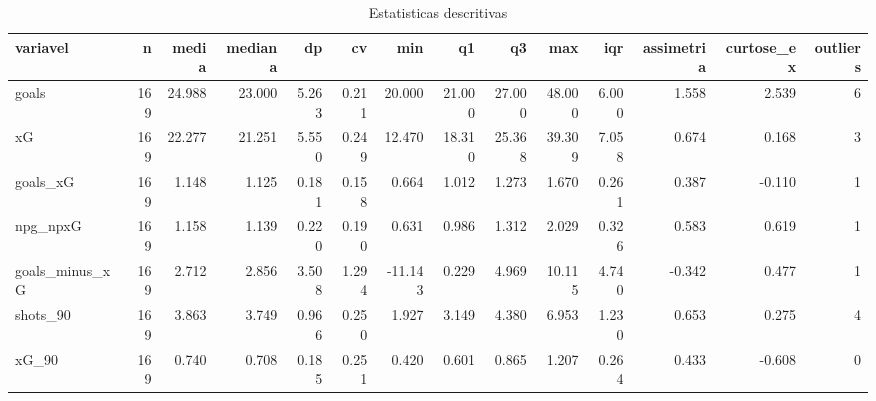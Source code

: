 \begin{table}

\caption{\label{tab:desc_g20}Estatisticas descritivas}
\centering
\begin{tabular}[t]{lrrrrrrrrrrrrr}
\toprule
variavel & n & media & mediana & dp & cv & min & q1 & q3 & max & iqr & assimetria & curtose\_ex & outliers\\
\midrule
goals & 169 & 24.988 & 23.000 & 5.263 & 0.211 & 20.000 & 21.000 & 27.000 & 48.000 & 6.000 & 1.558 & 2.539 & 6\\
xG & 169 & 22.277 & 21.251 & 5.550 & 0.249 & 12.470 & 18.310 & 25.368 & 39.309 & 7.058 & 0.674 & 0.168 & 3\\
goals\_xG & 169 & 1.148 & 1.125 & 0.181 & 0.158 & 0.664 & 1.012 & 1.273 & 1.670 & 0.261 & 0.387 & -0.110 & 1\\
npg\_npxG & 169 & 1.158 & 1.139 & 0.220 & 0.190 & 0.631 & 0.986 & 1.312 & 2.029 & 0.326 & 0.583 & 0.619 & 1\\
goals\_minus\_xG & 169 & 2.712 & 2.856 & 3.508 & 1.294 & -11.143 & 0.229 & 4.969 & 10.115 & 4.740 & -0.342 & 0.477 & 1\\
\addlinespace
shots\_90 & 169 & 3.863 & 3.749 & 0.966 & 0.250 & 1.927 & 3.149 & 4.380 & 6.953 & 1.230 & 0.653 & 0.275 & 4\\
xG\_90 & 169 & 0.740 & 0.708 & 0.185 & 0.251 & 0.420 & 0.601 & 0.865 & 1.207 & 0.264 & 0.433 & -0.608 & 0\\
\bottomrule
\end{tabular}
\end{table}
